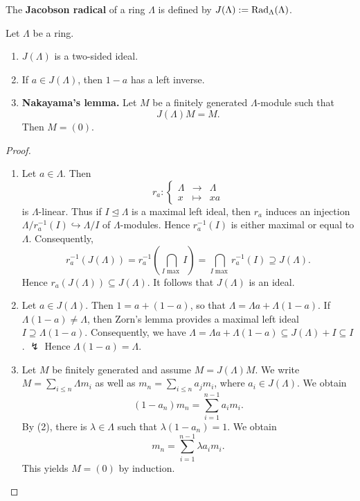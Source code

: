 
\begin{definition}
The \textbf{Jacobson radical} of a ring $\Lambda$ is defined by $J(\Lambda):=\operatorname{Rad}_\Lambda(\Lambda)$.
\end{definition}


\begin{lemma}\label{1.2.4}
Let $\Lambda$ be a ring.
\begin{enumerate}
\item $J(\Lambda)$ is a two-sided ideal.
\item If $a\in J(\Lambda)$, then $1-a$ has a left inverse.
\item \textup{\textbf{Nakayama's lemma.}} Let $M$ be a finitely generated $\Lambda$-module such that
\[
J(\Lambda)M=M.
\]
Then $M=(0)$.
\end{enumerate}
\end{lemma}


\begin{proof}\
\begin{enumerate}
\item Let $a\in \Lambda$. Then
\[
r_a:
\left\{
\begin{matrix}
\Lambda & \to & \Lambda \\
x & \mapsto & xa
\end{matrix}
\right.
\]
is $\Lambda$-linear. Thus if $I\trianglelefteq \Lambda$ is a maximal left ideal, then $r_a$ induces an injection $\Lambda/r_a^{-1}(I)\hookrightarrow \Lambda/I$ of $\Lambda$-modules. Hence $r_a^{-1}(I)$ is either maximal or equal to $\Lambda$. Consequently,
\[
r_a^{-1}(J(\Lambda))
 = r_a^{-1}\left(\bigcap_{I \max} I\right)
 = \bigcap_{I\max} r_a^{-1}(I)
 \supseteq J(\Lambda).
\]
Hence $r_a(J(\Lambda))\subseteq J(\Lambda)$. It follows that $J(\Lambda)$ is an ideal.

\item Let $a\in J(\Lambda)$. Then $1=a+(1-a)$, so that $\Lambda=\Lambda a+\Lambda(1-a)$. If $\Lambda(1-a)\neq \Lambda$, then Zorn's lemma provides a maximal left ideal $I\supseteq \Lambda(1-a)$. Consequently, we have $\Lambda= \Lambda a+\Lambda(1-a) \subseteq J(\Lambda)+I\subseteq I$. $\lightning$ Hence $\Lambda(1-a)=\Lambda$.

\item Let $M$ be finitely generated and assume $M=J(\Lambda)M$. We write $M=\sum_{i\le n}\Lambda m_i$ as well as $m_n=\sum_{i\le n} a_j m_i$, where $a_i\in J(\Lambda)$. We obtain
\[
(1-a_n)m_n = \sum_{i=1}^{n-1} a_i m_i.
\]
By (2), there is $\lambda\in\Lambda$ such that $\lambda(1-a_n)=1$. We obtain
\[
m_n = \sum_{i=1}^{n-1} \lambda a_i m_i.
\]
This yields $M=(0)$ by induction.\qedhere
\end{enumerate}
\end{proof}

